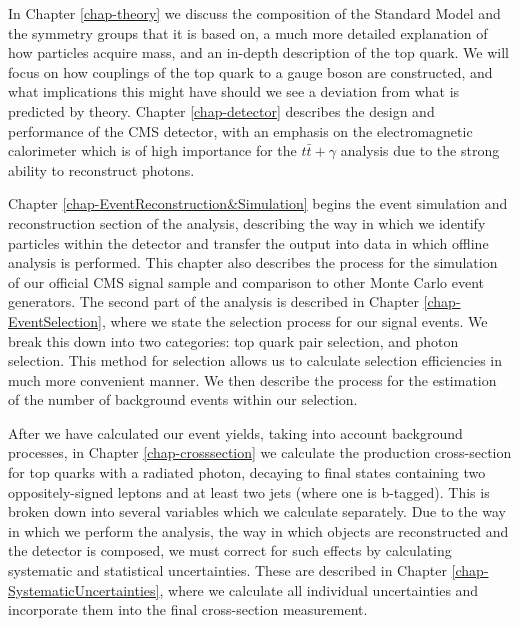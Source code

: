 In Chapter \ref{chap-theory} we discuss the composition of the Standard Model and the symmetry groups that it is based on, a much more detailed explanation of how particles acquire mass, and an in-depth description of the top quark. We will focus on how couplings of the top quark to a gauge boson are constructed, and what implications this might have should we see a deviation from what is predicted by theory. Chapter \ref{chap-detector} describes the design and performance of the CMS detector, with an emphasis on the electromagnetic calorimeter which is of high importance for the $t\bar{t}+\gamma$ analysis due to the strong ability to reconstruct photons. 

Chapter \ref{chap-EventReconstruction&Simulation} begins the event simulation and reconstruction section of the analysis, describing the way in which we identify particles within the detector and transfer the output into data in which offline analysis is performed. This chapter also describes the process for the simulation of our official CMS signal sample and comparison to other Monte Carlo event generators. The second part of the analysis is described in Chapter \ref{chap-EventSelection}, where we state the selection process for our signal events. We break this down into two categories: top quark pair selection, and photon selection. This method for selection allows us to calculate selection efficiencies in much more convenient manner. We then describe the process for the estimation of the number of background events within our selection. 

After we have calculated our event yields, taking into account background processes, in Chapter \ref{chap-crosssection} we calculate the production cross-section for top quarks with a radiated photon, decaying to final states containing two oppositely-signed leptons and at least two jets (where one is b-tagged). This is broken down into several variables which we calculate separately. Due to the way in which we perform the analysis, the way in which objects are reconstructed and the detector is composed, we must correct for such effects by calculating systematic and statistical uncertainties. These are described in Chapter \ref{chap-SystematicUncertainties}, where we calculate all individual uncertainties and incorporate them into the final cross-section measurement. 



